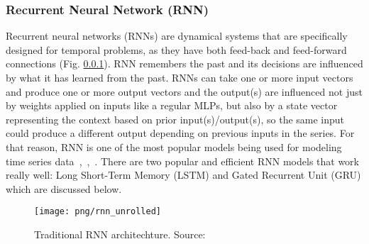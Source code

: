 \documentclass[../main.tex]{subfiles}
\begin{document}
\subsubsection{Recurrent Neural Network (RNN)}
\label{model_rnn}
	Recurrent neural networks (RNNs) are dynamical systems that are specifically designed for temporal problems, as they have both feed-back and feed-forward connections (Fig. \ref{model_rnn}). RNN remembers the past and  its decisions are influenced by what it has learned from the past. RNNs can take one or more input vectors and produce one or more output vectors and the output(s) are influenced not just by weights applied on inputs like a regular MLPs, but also by a state vector representing the context based on prior input(s)/output(s),  so the same input could produce a different output depending on previous inputs in the series. For that reason, RNN is one of the most popular models being used for modeling time series data~\cite{zhang2000predicting},~\cite{connor1994recurrent},~\cite{chandra2012cooperative}. There are two popular and efficient RNN models that work really well: Long Short-Term Memory (LSTM) and Gated Recurrent Unit (GRU) which are discussed below. 
\begin{figure}[!ht] 
   \centering
   \texttt{[image: png/rnn\_unrolled]}
  \caption{Traditional RNN architechture. Source: \cite{chris2015lstm}} 
  \label{model_lstm_gru} 
\end{figure}
\end{document}
